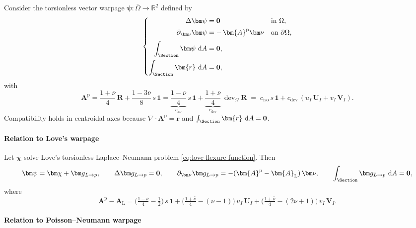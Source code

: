 Consider the torsionless vector warpage $\bm\psi:\bar\Omega\to\mathbb R^2$ defined by
\begin{equation}
\left\{
\begin{aligned}
\Delta \bm\psi &= \mathbf{0} && \text{in }\Omega,\\[2pt]
\partial_{\bm\nu}\bm\psi &= -\,\bm{A}^{\mathrm p} \bm\nu && \text{on }\partial\Omega,\\[2pt]
\displaystyle\int_{\Section}\bm\psi\mathrm{~d}A &=\mathbf{0}, \\ 
\int_{\Section}\bm{r}\mathrm{~d}A&=\mathbf{0},
\end{aligned}
\right.
\end{equation}
with
\begin{equation}
\bm{A}^{\mathrm p}
=\frac{1+\bar{\nu}}{4}\,\bm R+\frac{1-3\bar{\nu}}{8}\,s\,\bm 1
=\underbrace{\frac{1-\bar{\nu}}{4}}_{c_{\mathrm{iso}}}\,s\,\bm 1
+\underbrace{\frac{1+\bar{\nu}}{4}}_{c_{\mathrm{dev}}}\,\operatorname{dev}_{\Omega}\bm R
\;=\;c_{\mathrm{iso}}\,s\,\bm 1+c_{\mathrm{dev}}\,(u_I\,\bm U_I+v_I\,\bm V_I).
\end{equation}
Compatibility holds in centroidal axes because $\nabla\cdot\bm{A}^{\mathrm p}=\bm{r}$ and $\int_{\Section}\bm{r}\mathrm{~d}A=\mathbf{0}$.

\paragraph{Relation to Love's warpage}

Let $\bm\chi$ solve Love’s torsionless Laplace–Neumann problem \eqref{eq:love-flexure-function}. 
Then
\[
\bm\psi=\bm\chi+\bm g_{L\to p},\qquad
\Delta \bm g_{L\to p}=\mathbf{0},\qquad
\partial_{\bm\nu}\bm g_{L\to p}=-(\bm{A}^{\mathrm p}-\bm{A}_{\mathrm L})\,\bm\nu,\qquad
\int_{\Section}\bm g_{L\to p}\mathrm{~d}A=\mathbf{0},
\]
where
\[
\bm{A}^{\mathrm p}-\bm{A}_{\mathrm L}
=\Big(\tfrac{1-\bar{\nu}}{4}-\tfrac12\Big)\,s\,\bm 1
+\Big(\tfrac{1+\bar{\nu}}{4}-(\nu-1)\Big)\,u_I\,\bm U_I
+\Big(\tfrac{1+\bar{\nu}}{4}-(2\nu+1)\Big)\,v_I\,\bm V_I.
\]

\paragraph{Relation to Poisson–Neumann warpage}

